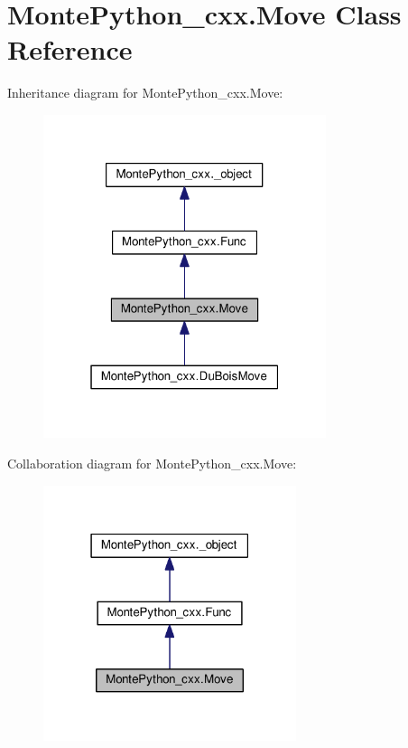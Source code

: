 \hypertarget{classMontePython__cxx_1_1Move}{}\section{Monte\+Python\+\_\+cxx.\+Move Class Reference}
\label{classMontePython__cxx_1_1Move}


Inheritance diagram for Monte\+Python\+\_\+cxx.\+Move\+:
\nopagebreak
\begin{figure}[H]
\begin{center}
\leavevmode
\includegraphics[width=235pt]{classMontePython__cxx_1_1Move__inherit__graph}
\end{center}
\end{figure}


Collaboration diagram for Monte\+Python\+\_\+cxx.\+Move\+:
\nopagebreak
\begin{figure}[H]
\begin{center}
\leavevmode
\includegraphics[width=210pt]{classMontePython__cxx_1_1Move__coll__graph}
\end{center}
\end{figure}
